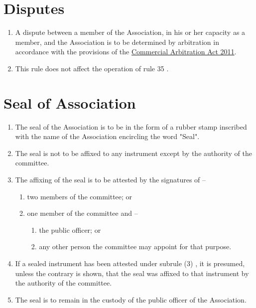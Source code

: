 \documentclass[a4paper,11pt]{article}
\begin{document}
\section{Disputes}
\begin{enumerate}
	\item A dispute between a member of the Association, in his or her capacity as a member, and the Association is to be determined by arbitration in accordance with the provisions of the \href{https://www.legislation.tas.gov.au/view/html/inforce/current/act-2011-013}{Commercial Arbitration Act 2011}.
	\item This rule does not affect the operation of rule 35 .
\end{enumerate}

\section{Seal of Association}
\begin{enumerate}
	\item The seal of the Association is to be in the form of a rubber stamp inscribed with the name of the Association encircling the word "Seal".
	\item The seal is not to be affixed to any instrument except by the authority of the committee.
	
	\item The affixing of the seal is to be attested by the signatures of --
	\begin{enumerate}
		\item two members of the committee; or
		\item one member of the committee and --
		\begin{enumerate}
			\item the public officer; or
			\item any other person the committee may appoint for that purpose.
		\end{enumerate}
	\end{enumerate}
	
	\item If a sealed instrument has been attested under subrule (3) , it is presumed, unless the contrary is shown, that the seal was affixed to that instrument by the authority of the committee.
	\item The seal is to remain in the custody of the public officer of the Association.
\end{enumerate}
\end{document}
